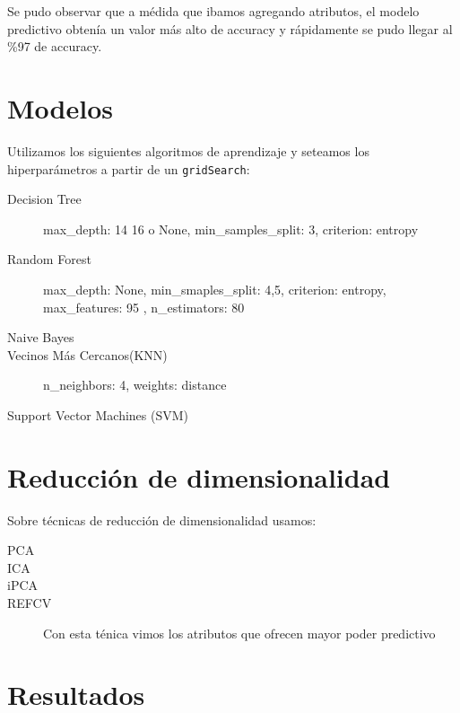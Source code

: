 \documentclass[10pt, a4paper]{article}
\begin{document}
Se pudo observar que a médida que ibamos agregando atributos, el modelo predictivo obtenía un valor más alto de accuracy y rápidamente se pudo llegar al \%97 de accuracy.

\section{Modelos}
Utilizamos los siguientes algoritmos de aprendizaje y seteamos los hiperparámetros a partir de un \texttt{gridSearch}:

\begin{description}
\item [Decision Tree] max\_depth: 14 16 o None, min\_samples\_split: 3, criterion: entropy
\item [Random Forest] max\_depth: None, min\_smaples\_split: 4,5, criterion: entropy, max\_features: 95 , n\_estimators: 80
\item [Naive Bayes]
\item [Vecinos Más Cercanos(KNN)]  n\_neighbors: 4, weights: distance
\item [Support Vector Machines (SVM)]
\end{description}


\section{Reducción de dimensionalidad}
Sobre técnicas de reducción de dimensionalidad usamos:

\begin{description}
\item [PCA]
\item [ICA]
\item [iPCA]
\item [REFCV] Con esta ténica vimos los atributos que ofrecen mayor poder predictivo
\end{description}

\section{Resultados}
\end{document}
